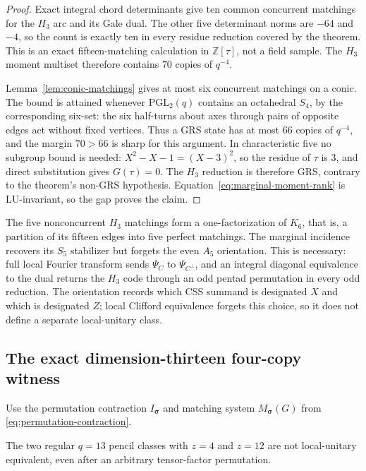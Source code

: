 \begin{proof}
Exact integral chord determinants give ten common concurrent matchings
for the \(H_3\) arc and its Gale dual.  The other five determinant norms are
\(-64\) and \(-4\), so the count is exactly ten in every residue
reduction covered by the theorem.  This is an exact fifteen-matching
calculation in \(\mathbb Z[\tau]\), not a field sample.  The \(H_3\) moment
multiset therefore contains \(70\) copies of \(q^{-4}\).

Lemma~\ref{lem:conic-matchings} gives at most six concurrent matchings
on a conic.  The bound is attained whenever \(\mathrm{PGL}_2(q)\) contains
an octahedral \(S_4\), by the corresponding six-set: the six
half-turns about axes through pairs of opposite edges act without fixed
vertices.  Thus a GRS state has at most \(66\) copies of \(q^{-4}\), and
the margin \(70>66\) is sharp for this argument.  In
characteristic five no subgroup bound is needed:
\(X^2-X-1=(X-3)^2\), so the residue of \(\tau\) is \(3\), and direct
substitution gives \(G(\tau)=0\).  The \(H_3\) reduction is therefore GRS,
contrary to the theorem's non-GRS hypothesis.
Equation~\eqref{eq:marginal-moment-rank} is
LU-invariant, so the gap proves the claim.
\end{proof}

The five nonconcurrent \(H_3\) matchings form a one-factorization of \(K_6\),
that is, a partition of its fifteen edges into five perfect matchings.
The marginal incidence recovers its \(S_5\) stabilizer but forgets the
even \(A_5\) orientation.  This is necessary: full local Fourier
transform sends \(\Psi_C\) to \(\Psi_{C^\perp}\), and an integral
diagonal equivalence to the dual returns the \(H_3\) code through an odd pentad permutation in every
odd reduction.  The orientation records which CSS summand is designated
\(X\) and which is designated \(Z\); local Clifford equivalence forgets this
choice, so it does not define a separate local-unitary class.

\subsection{The exact dimension-thirteen four-copy witness}

Use the permutation contraction
\(I_{\boldsymbol\sigma}\) and matching system
\(M_{\boldsymbol\sigma}(G)\) from
\eqref{eq:permutation-contraction}.

\begin{theorem}[Exact four-copy separator at \(q=13\)]
\label{thm:q13-lu}
The two regular \(q=13\) pencil classes with \(z=4\) and \(z=12\) are
not local-unitary equivalent, even after an arbitrary tensor-factor permutation.
\end{theorem}

